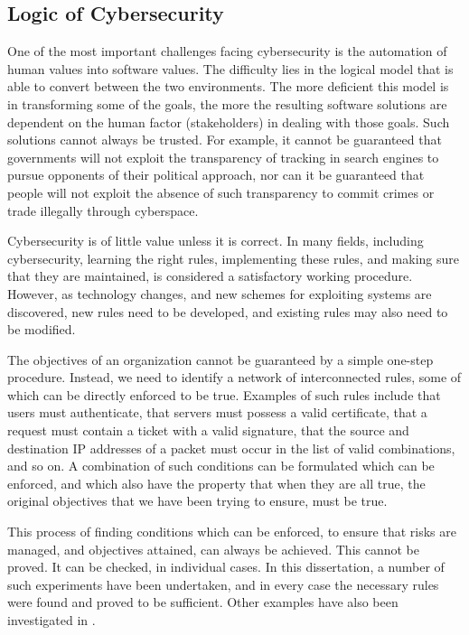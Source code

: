 \subsection{Logic of Cybersecurity}
One of the most important challenges facing cybersecurity is the automation of human values ​​into software values. The difficulty lies in the logical model that is able to convert between the two environments. The more deficient this model is in transforming some of the goals, the more the resulting software solutions are dependent on the human factor (stakeholders) in dealing with those goals. Such solutions cannot always be trusted. For example, it cannot be guaranteed that governments will not exploit  the transparency of tracking in search engines to pursue opponents of their political approach, nor can it be guaranteed that people will not exploit the absence of such transparency to commit crimes or trade illegally through cyberspace.

Cybersecurity is of little value unless it is correct. In many fields, including cybersecurity, learning the right rules, implementing these rules, and making sure that they are maintained, is considered a satisfactory working procedure. However, as technology changes, and new schemes for exploiting systems are discovered, new rules need to be developed, and existing rules may also need to be modified.

The objectives of an organization cannot be guaranteed by a simple one-step procedure. Instead, we need to identify a network of interconnected rules, some of which can be directly enforced to be true. Examples of such rules include that users must authenticate, that servers must possess a valid certificate, that a request must contain a ticket with a valid signature, that the source and destination IP addresses of a packet must occur in the list of valid combinations, and so on. A combination of such conditions can be formulated which can be enforced, and which also have the property that when they are all true, the original objectives that we have been trying to ensure, must be true.

This process of finding conditions which can be enforced, to ensure that risks are managed, and objectives attained, can always be achieved. This cannot be proved. It can be checked, in individual cases. In this dissertation,  a number of such experiments have been undertaken, and in every case the necessary rules were found and proved to be sufficient. Other examples have also been investigated in \cite{Hadaad15,sheniar2018experiments,sheniar2019Graph}.




